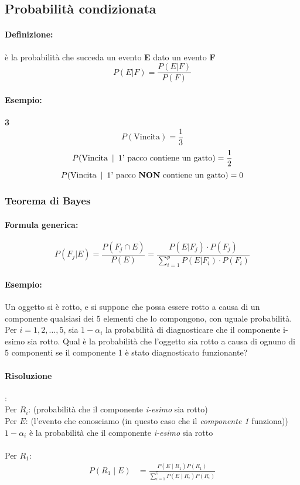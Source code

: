 \documentclass[]{article}
\newcommand{\definizione}{\paragraph{Definizione:}}
\newcommand{\formula}{\paragraph{Formula generica:}}
\begin{document}
    \subsection{Probabilità condizionata}
    \definizione è la probabilità che succeda un evento \textbf{E} dato un evento \textbf{F}
    \[ P(E | F) = \frac{P(E | F)}{P(F)}\]
    \paragraph{Esempio:} \textbf{3}  \\
    \[ P(\text{Vincita}) = \frac{1}{3}\]
    \[ P(\text{Vincita} \hspace{0.5em} | \hspace{0.5em} \text{1' pacco contiene un gatto}) = \frac{1}{2}\]
    \[ P(\text{Vincita} \hspace{0.5em} | \hspace{0.5em} \text{1' pacco \textbf{NON} contiene un gatto}) = 0\]



    \subsubsection{Teorema di Bayes}
    \formula \[ P(F_j | E) = \frac{P(F_j \cap E)}{P(E)} = \frac{P(E | F_j) \cdot P(F_j)}{\sum_{i = 1}^{p} P(E | F_i) \cdot P(F_i)} \]
    \begin{center} 
    \end{center}
    \paragraph{Esempio:}
    Un oggetto si è rotto, e si suppone che possa essere rotto a causa di un componente qualsiasi dei 5 elementi che lo compongono, con uguale probabilità. Per $i=1,2, \ldots, 5$, sia $1-\alpha_i$ la probabilità di diagnosticare che il componente i-esimo sia rotto. Qual è la probabilità che l'oggetto sia rotto a causa di ognuno di 5 componenti se il componente 1 è stato diagnosticato funzionante?

    \paragraph{Risoluzione}: \\
    Per $R_i$: (probabilità che il componente \textit{i-esimo} sia rotto) \\
    Per $E$: (l'evento che conosciamo (in questo caso che il \textit{componente 1} funziona)) \\
    $1 - \alpha_i$ è la probabilità che il componente \textit{i-esimo} sia rotto \\ \\
    Per $R_1$:
    $$
        \begin{aligned}
            P\left(R_1 \mid E\right) & =\frac{P\left(E \mid R_1\right) P\left(R_1\right)}{\sum_{i=1}^5 P\left(E \mid R_i\right) P\left(R_i\right)} \\
        \end{aligned}
    $$
\end{document}

